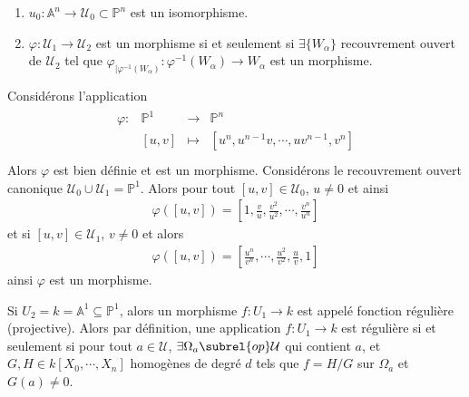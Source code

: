             \begin{exo}
                \begin{enumerate}
                    \item $u_0 : \mathbb{A}^n \to \mathcal{U}_0 \subset \mathbb{P}^n$ est un isomorphisme.
                    \item $\varphi : \mathcal{U}_1 \to \mathcal{U}_2$ est un morphisme si et seulement si $\exists \{W_\alpha\}$ recouvrement ouvert de $\mathcal{U}_2$ tel que $\varphi_{|\varphi^{-1}(W_\alpha)} : \varphi^{-1}(W_\alpha) \to W_\alpha$ est un morphisme.
                \end{enumerate}
            \end{exo}
            \begin{expl}
                Considérons l'application 
                \begin{align*}
                    \begin{array}{cccc}
                        \varphi : & \mathbb{P}^1 & \to & \mathbb{P}^n \\
                        & [u,v] & \mapsto & [u^n, u^{n-1}v, \cdots, uv^{n-1}, v^n]\\
                    \end{array}
                \end{align*}
                Alors $\varphi$ est bien définie et est un morphisme. Considérons le recouvrement ouvert canonique $\mathcal{U}_0 \cup \mathcal{U}_1 = \mathbb{P}^1$. Alors pour tout  $[u,v] \in \mathcal{U}_0$, $u \neq 0$ et ainsi
                    \begin{align*}
                        \varphi([u,v]) = \left[ 1, \frac vu, \frac{v^2}{u^2}, \cdots, \frac{v^n}{u^n} \right]
                    \end{align*}
                    et si $[u,v] \in \mathcal{U}_1$, $v \neq 0$ et alors 
                    \begin{align*}
                        \varphi([u,v]) = \left[ \frac{u^n}{v^n}, \cdots, \frac{u^2}{v^2}, \frac uv, 1  \right]
                    \end{align*}
                    ainsi $\varphi$ est un morphisme.
            \end{expl}
            \begin{remq}
                Si $U_2 = k = \mathbb{A}^1 \subseteq \mathbb{P}^1$, alors un morphisme $f : U_1 \to k$ est appelé fonction régulière (projective). Alors par définition, une application $f : U_1 \to k$ est régulière si et seulement si pour tout $a \in \mathcal{U}$, $\exists \Omega_a \subrel{op} \mathcal{U}$ qui contient $a$, et $G, H \in k[X_0, \cdots, X_n]$ homogènes de degré $d$ tels que $f = H/G$ sur $\Omega_a$ et $G(a) \neq 0$.
            \end{remq}
